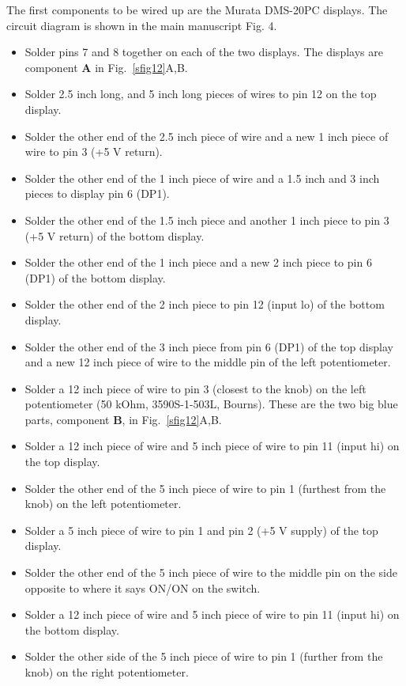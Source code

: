 \documentclass[10pt,letterpaper]{article}
\begin{document}
%
The first components to be wired up are the Murata DMS-20PC displays. The circuit diagram is shown in the main manuscript Fig. 4.
\begin{itemize}
    \item Solder pins 7 and 8 together on each of the two displays. The displays are component \textbf{A} in Fig.~\ref{sfig12}A,B.
    \item Solder 2.5 inch long, and 5 inch long pieces of wires to pin 12 on the top display.
    \item Solder the other end of the 2.5 inch piece of wire and a new 1 inch piece of wire to pin 3 (+5 V return).
    \item Solder the other end of the 1 inch piece of wire and a 1.5 inch and 3 inch pieces to display pin 6 (DP1).
    \item Solder the other end of the 1.5 inch piece and another 1 inch piece to pin 3 (+5 V return) of the bottom display.
    \item Solder the other end of the 1 inch piece and a new 2 inch piece to pin 6 (DP1) of the bottom display.
    \item Solder the other end of the 2 inch piece to pin 12 (input lo) of the bottom display.
    \item Solder the other end of the 3 inch piece from pin 6 (DP1) of the top display and a new 12 inch piece of wire to the middle pin of the left potentiometer.
    \item Solder a 12 inch piece of wire to pin 3 (closest to the knob) on the left potentiometer (50 kOhm, 3590S-1-503L, Bourns). These are the two big blue parts, component \textbf{B}, in Fig.~\ref{sfig12}A,B.
    \item Solder a 12 inch piece of wire and 5 inch piece of wire to pin 11 (input hi) on the top display.
    \item Solder the other end of the 5 inch piece of wire to pin 1 (furthest from the knob) on the left potentiometer.
    \item Solder a 5 inch piece of wire to pin 1 and pin 2 (+5 V supply) of the top display.
    \item Solder the other end of the 5 inch piece of wire to the middle pin on the side opposite to where it says ON/ON on the switch.
    \item Solder a 12 inch piece of wire and 5 inch piece of wire to pin 11 (input hi) on the bottom display.
    \item Solder the other side of the 5 inch piece of wire to pin 1 (further from the knob) on the right potentiometer.

\end{itemize}
\end{document}
